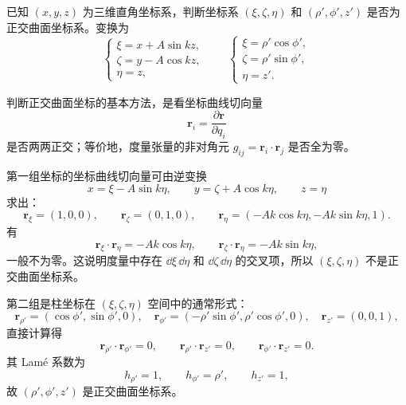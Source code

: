﻿


\begin{question}
已知 \((x,y,z)\) 为三维直角坐标系，判断坐标系 \((\xi,\zeta,\eta)\) 和 \((\rho',\phi',z')\) 是否为正交曲面坐标系。变换为
\[
\begin{cases}
\xi=x+A\sin kz,\\
\zeta=y-A\cos kz,\\
\eta=z,
\end{cases}
\qquad
\begin{cases}
\xi=\rho'\cos\phi',\\
\zeta=\rho'\sin\phi',\\
\eta=z'.
\end{cases}
\]
\begin{solution}
判断正交曲面坐标的基本方法，是看坐标曲线切向量
\[
\bm r_i=\frac{\partial\bm r}{\partial q_i}
\]
是否两两正交；等价地，度量张量的非对角元 \(g_{ij}=\bm r_i\cdot\bm r_j\) 是否全为零。

第一组坐标的坐标曲线切向量可由逆变换
\[
x=\xi-A\sin k\eta,\qquad y=\zeta+A\cos k\eta,\qquad z=\eta
\]
求出：
\[
\bm r_\xi=(1,0,0),\qquad
\bm r_\zeta=(0,1,0),\qquad
\bm r_\eta=(-Ak\cos k\eta,-Ak\sin k\eta,1).
\]
有
\[
\bm r_\xi\cdot\bm r_\eta=-Ak\cos k\eta,\qquad
\bm r_\zeta\cdot\bm r_\eta=-Ak\sin k\eta,
\]
一般不为零。这说明度量中存在 \(\dd{\xi}\,\dd{\eta}\) 和 \(\dd{\zeta}\,\dd{\eta}\) 的交叉项，所以 \((\xi,\zeta,\eta)\) 不是正交曲面坐标系。

第二组是柱坐标在 \((\xi,\zeta,\eta)\) 空间中的通常形式：
\[
\bm r_{\rho'}=(\cos\phi',\sin\phi',0),\quad
\bm r_{\phi'}=(-\rho'\sin\phi',\rho'\cos\phi',0),\quad
\bm r_{z'}=(0,0,1),
\]
直接计算得
\[
\bm r_{\rho'}\cdot\bm r_{\phi'}=0,\qquad
\bm r_{\rho'}\cdot\bm r_{z'}=0,\qquad
\bm r_{\phi'}\cdot\bm r_{z'}=0.
\]
其 Lamé 系数为
\[
h_{\rho'}=1,\qquad h_{\phi'}=\rho',\qquad h_{z'}=1,
\]
故 \((\rho',\phi',z')\) 是正交曲面坐标系。
\end{solution}
\end{question}

